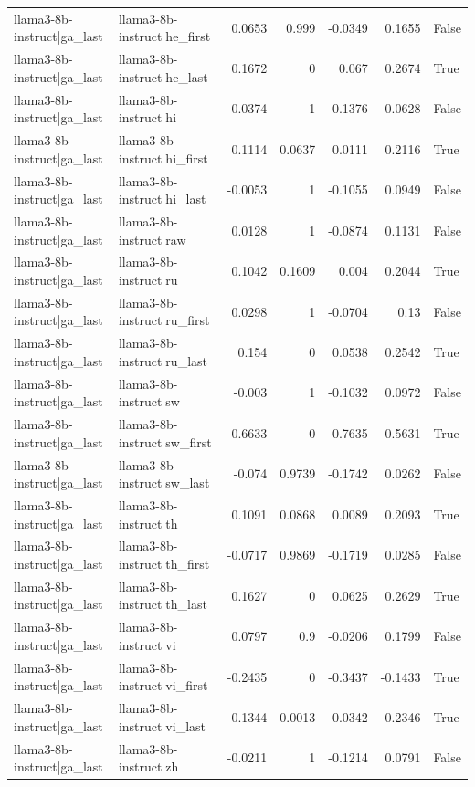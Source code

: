 \begin{table}
\begin{tabular}{l l r r r r l}
llama3-8b-instruct|ga_last & llama3-8b-instruct|he_first & 0.0653 & 0.999 & -0.0349 & 0.1655 & False \\
llama3-8b-instruct|ga_last & llama3-8b-instruct|he_last & 0.1672 & 0 & 0.067 & 0.2674 & True \\
llama3-8b-instruct|ga_last & llama3-8b-instruct|hi & -0.0374 & 1 & -0.1376 & 0.0628 & False \\
llama3-8b-instruct|ga_last & llama3-8b-instruct|hi_first & 0.1114 & 0.0637 & 0.0111 & 0.2116 & True \\
llama3-8b-instruct|ga_last & llama3-8b-instruct|hi_last & -0.0053 & 1 & -0.1055 & 0.0949 & False \\
llama3-8b-instruct|ga_last & llama3-8b-instruct|raw & 0.0128 & 1 & -0.0874 & 0.1131 & False \\
llama3-8b-instruct|ga_last & llama3-8b-instruct|ru & 0.1042 & 0.1609 & 0.004 & 0.2044 & True \\
llama3-8b-instruct|ga_last & llama3-8b-instruct|ru_first & 0.0298 & 1 & -0.0704 & 0.13 & False \\
llama3-8b-instruct|ga_last & llama3-8b-instruct|ru_last & 0.154 & 0 & 0.0538 & 0.2542 & True \\
llama3-8b-instruct|ga_last & llama3-8b-instruct|sw & -0.003 & 1 & -0.1032 & 0.0972 & False \\
llama3-8b-instruct|ga_last & llama3-8b-instruct|sw_first & -0.6633 & 0 & -0.7635 & -0.5631 & True \\
llama3-8b-instruct|ga_last & llama3-8b-instruct|sw_last & -0.074 & 0.9739 & -0.1742 & 0.0262 & False \\
llama3-8b-instruct|ga_last & llama3-8b-instruct|th & 0.1091 & 0.0868 & 0.0089 & 0.2093 & True \\
llama3-8b-instruct|ga_last & llama3-8b-instruct|th_first & -0.0717 & 0.9869 & -0.1719 & 0.0285 & False \\
llama3-8b-instruct|ga_last & llama3-8b-instruct|th_last & 0.1627 & 0 & 0.0625 & 0.2629 & True \\
llama3-8b-instruct|ga_last & llama3-8b-instruct|vi & 0.0797 & 0.9 & -0.0206 & 0.1799 & False \\
llama3-8b-instruct|ga_last & llama3-8b-instruct|vi_first & -0.2435 & 0 & -0.3437 & -0.1433 & True \\
llama3-8b-instruct|ga_last & llama3-8b-instruct|vi_last & 0.1344 & 0.0013 & 0.0342 & 0.2346 & True \\
llama3-8b-instruct|ga_last & llama3-8b-instruct|zh & -0.0211 & 1 & -0.1214 & 0.0791 & False \\

\end{tabular}
\end{table}
